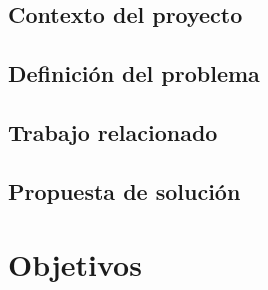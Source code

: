 \documentclass[11pt,letterpaper]{article}
\begin{document}
\subsection{Contexto del proyecto} 


\subsection{Definición del problema} 


\subsection{Trabajo relacionado} 


\subsection{Propuesta de solución}





\section{Objetivos}



\end{document}

